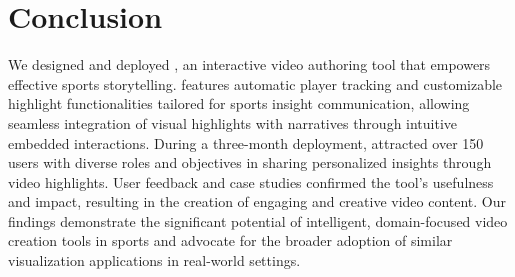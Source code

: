 \section{Conclusion}
We designed and deployed \SB{}, an interactive video authoring tool that empowers effective sports storytelling. \SB{} features automatic player tracking and customizable highlight functionalities tailored for sports insight communication, allowing seamless integration of visual highlights with narratives through intuitive embedded interactions.  
During a three-month deployment, \SB{} attracted over 150 users with diverse roles and objectives in sharing personalized insights through video highlights. User feedback and case studies confirmed the tool’s usefulness and impact, resulting in the creation of engaging and creative video content. 
Our findings demonstrate the significant potential of intelligent, domain-focused video creation tools in sports and advocate for the broader adoption of similar visualization applications in real-world settings. 